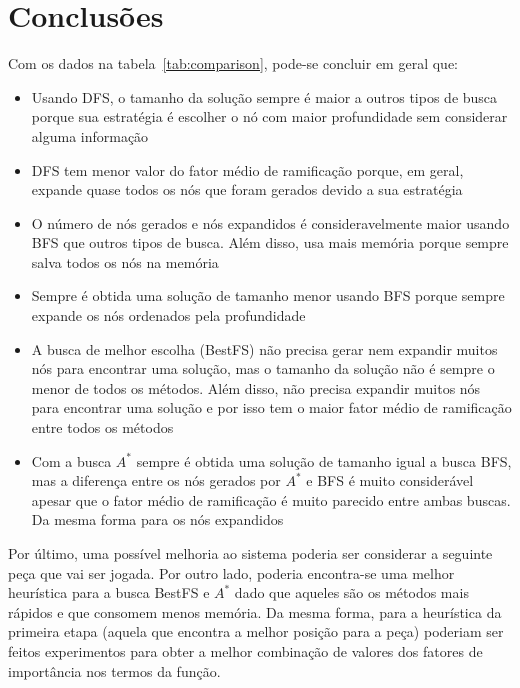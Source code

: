 \section{Conclusões}
	Com os dados na tabela~\ref{tab:comparison}, pode-se concluir em geral que:
	\begin{itemize}
		\item Usando DFS, o tamanho da solução sempre é maior a outros tipos de busca porque sua estratégia é escolher o nó com maior profundidade sem considerar alguma informação
		\item DFS tem menor valor do fator médio de ramificação porque, em geral, expande quase todos os nós que foram gerados devido a sua estratégia
		\item O número de nós gerados e nós expandidos é consideravelmente maior usando BFS que outros tipos de busca. Além disso, usa mais memória porque sempre salva todos os nós na memória
		\item Sempre é obtida uma solução de tamanho menor usando BFS porque sempre expande os nós ordenados pela profundidade
		\item A busca de melhor escolha (BestFS) não precisa gerar nem expandir muitos nós para encontrar uma solução, mas o tamanho da solução não é sempre o menor de todos os métodos. Além disso, não precisa expandir muitos nós para encontrar uma solução e por isso tem o maior fator médio de ramificação entre todos os métodos
		\item Com a busca $A^*$ sempre é obtida uma solução de tamanho igual a busca BFS, mas a diferença entre os nós gerados por $A^*$ e BFS é muito considerável apesar que o fator médio de ramificação é muito parecido entre ambas buscas. Da mesma forma para os nós expandidos
	\end{itemize}
	Por último, uma possível melhoria ao sistema poderia ser considerar a seguinte peça que vai ser jogada. Por outro lado, poderia encontra-se uma melhor heurística para a busca BestFS e $A^*$ dado que aqueles são os métodos mais rápidos e que consomem menos memória. Da mesma forma, para a heurística da primeira etapa (aquela que encontra a melhor posição para a peça) poderiam ser feitos experimentos para obter a melhor combinação de valores dos fatores de importância nos termos da função.